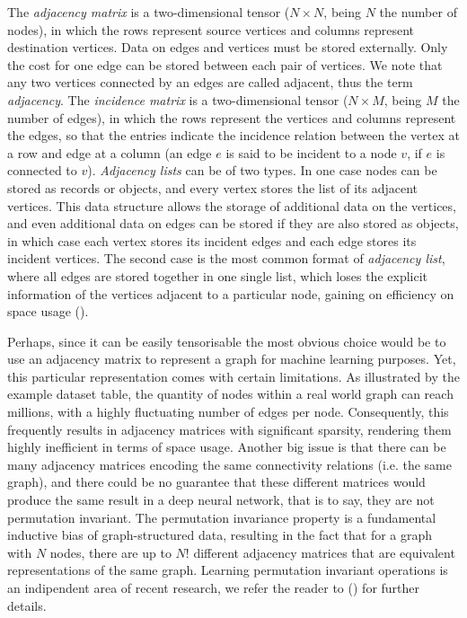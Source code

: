 \documentclass[binding=0.6cm]{sapthesis}
\newcommand{\mycite}[1]{(\cite{#1})}
\begin{document}
The \textit{adjacency matrix} is a two-dimensional tensor ($N \times N$, being $N$ the number of nodes), in which the rows represent source vertices and columns represent destination vertices. Data on edges and vertices must be stored externally. Only the cost for one edge can be stored between each pair of vertices. We note that any two vertices connected by an edges are called adjacent, thus the term \textit{adjacency}. The \textit{incidence matrix} is a two-dimensional tensor ($N \times M$, being $M$ the number of edges), in which the rows represent the vertices and columns represent the edges, so that the entries indicate the incidence relation between the vertex at a row and edge at a column (an edge $e$ is said to be incident to a node $v$, if $e$ is connected to $v$). \textit{Adjacency lists} can be of two types. In one case nodes can be stored as records or objects, and every vertex stores the list of its adjacent vertices. This data structure allows the storage of additional data on the vertices, and even additional data on edges can be stored if they are also stored as objects, in which case each vertex stores its incident edges and each edge stores its incident vertices. The second case is the most common format of \textit{adjacency list}, where all edges are stored together in one single list, which loses the explicit information of the vertices adjacent to a particular node, gaining on efficiency on space usage \mycite{cormen2022introduction}.  

Perhaps, since it can be easily tensorisable the most obvious choice would be to use an adjacency matrix to represent a graph for machine learning purposes. Yet, this particular representation comes with certain limitations. As illustrated by the example dataset table, the quantity of nodes within a real world graph can reach millions, with a highly fluctuating number of edges per node. Consequently, this frequently results in adjacency matrices with significant sparsity, rendering them highly inefficient in terms of space usage. Another big issue is that there can be many adjacency matrices encoding the same connectivity relations (i.e. the same graph), and there could be no guarantee that these different matrices would produce the same result in a deep neural network, that is to say, they are not permutation invariant. The permutation invariance property is a fundamental inductive bias of graph-structured data, resulting in the fact that for a graph with $N$ nodes, there are up to $N!$ different adjacency matrices that are equivalent representations of the same graph. Learning permutation invariant operations is an indipendent area of recent research, we refer the reader to \mycite{mena2018learning,murphy2019janossy} for further details.
\end{document}
